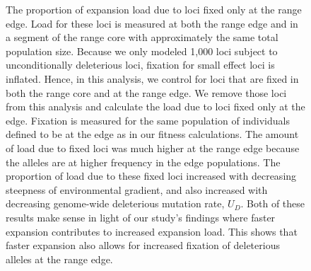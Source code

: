 \begin{figure}[h!]
\centering
{}
\caption[ ~ - Load due to loci fixed at the range edge.]{The proportion of expansion load due to loci fixed only at the range edge. Load for these loci is measured at both the range edge and in a segment of the range core with approximately the same total population size. Because we only modeled 1,000 loci subject to unconditionally deleterious loci, fixation for small effect loci is inflated. Hence, in this analysis, we control for loci that are fixed in both the range core and at the range edge. We remove those loci from this analysis and calculate the load due to loci fixed only at the edge. Fixation is measured for the same population of individuals defined to be at the edge as in our fitness calculations. The amount of load due to fixed loci was much higher at the range edge because the alleles are at higher frequency in the edge populations. The proportion of load due to these fixed loci increased with decreasing steepness of environmental gradient, and also increased with decreasing genome-wide deleterious mutation rate, $U_D$. Both of these results make sense in light of our study's findings where faster expansion contributes to increased expansion load. This shows that faster expansion also allows for increased fixation of deleterious alleles at the range edge.}
\label{fig:fixedload}
\end{figure}


\newpage{}
